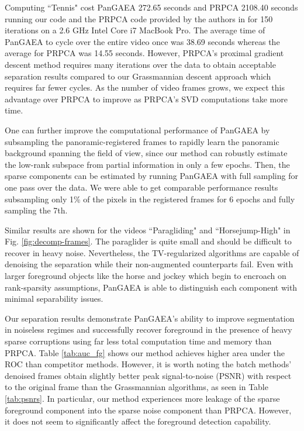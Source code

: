 \documentclass[10pt,twocolumn,letterpaper]{article}
\begin{document}
Computing ``Tennis" cost PanGAEA 272.65 seconds and PRPCA 2108.40 seconds running our code and the PRPCA code provided by the authors in \cite{B.Moore} for 150 iterations on a 2.6 GHz Intel Core i7 MacBook Pro. The average time of PanGAEA to cycle over the entire video once was 38.69 seconds whereas the average for PRPCA was 14.55 seconds. However, PRPCA's proximal gradient descent method requires many iterations over the data to obtain acceptable separation results compared to our Grassmannian descent approach which requires far fewer cycles. As the number of video frames grows, we expect this advantage over PRPCA to improve as PRPCA's SVD computations take more time. 

One can further improve the computational performance of PanGAEA by subsampling the panoramic-registered frames to rapidly learn the panoramic background spanning the field of view, since our method can robustly estimate the low-rank subspace from partial information in only a few epochs. Then, the sparse components can be estimated by running PanGAEA with full sampling for one pass over the data. We were able to get comparable performance results subsampling only 1\% of the pixels in the registered frames for 6 epochs and fully sampling the 7th.

Similar results are shown for the videos ``Paragliding" and ``Horsejump-High" in Fig. \ref{fig:decomp-frames}. The paraglider is quite small and should be difficult to recover in heavy noise. Nevertheless, the TV-regularized algorithms are capable of denoising the separation while their non-augmented counterparts fail. Even with larger foreground objects like the horse and jockey which begin to encroach on rank-sparsity assumptions, PanGAEA is able to distinguish each component with minimal separability issues.

Our separation results demonstrate PanGAEA's ability to improve segmentation in noiseless regimes and successfully recover foreground in the presence of heavy sparse corruptions using far less total computation time and memory than PRPCA. Table \ref{tab:auc_fg} shows our method achieves higher area under the ROC than competitor methods. However, it is worth noting the batch methods' denoised frames obtain slightly better peak signal-to-noise (PSNR) with respect to the original frame than the Grassmannian algorithms, as seen in Table \ref{tab:psnrs}. In particular, our method experiences more leakage of the sparse foreground component into the sparse noise component than PRPCA. However, it does not seem to significantly affect the foreground detection capability.
\end{document}
